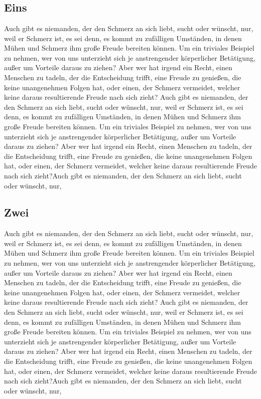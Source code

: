 %
\chapter{\appendixname}

\section{Eins}
Auch gibt es niemanden, der den Schmerz an sich liebt, sucht oder wünscht, nur, weil er Schmerz ist, es sei denn, es kommt zu zufälligen Umständen, in denen Mühen und Schmerz ihm große Freude bereiten können. Um ein triviales Beispiel zu nehmen, wer von uns unterzieht sich je anstrengender körperlicher Betätigung, außer um Vorteile daraus zu ziehen? Aber wer hat irgend ein Recht, einen Menschen zu tadeln, der die Entscheidung trifft, eine Freude zu genießen, die keine unangenehmen Folgen hat, oder einen, der Schmerz vermeidet, welcher keine daraus resultierende Freude nach sich zieht? Auch gibt es niemanden, der den Schmerz an sich liebt, sucht oder wünscht, nur, weil er Schmerz ist, es sei denn, es kommt zu zufälligen Umständen, in denen Mühen und Schmerz ihm große Freude bereiten können. Um ein triviales Beispiel zu nehmen, wer von uns unterzieht sich je anstrengender körperlicher Betätigung, außer um Vorteile daraus zu ziehen? Aber wer hat irgend ein Recht, einen Menschen zu tadeln, der die Entscheidung trifft, eine Freude zu genießen, die keine unangenehmen Folgen hat, oder einen, der Schmerz vermeidet, welcher keine daraus resultierende Freude nach sich zieht?Auch gibt es niemanden, der den Schmerz an sich liebt, sucht oder wünscht, nur,

\section{Zwei}
Auch gibt es niemanden, der den Schmerz an sich liebt, sucht oder wünscht, nur, weil er Schmerz ist, es sei denn, es kommt zu zufälligen Umständen, in denen Mühen und Schmerz ihm große Freude bereiten können. Um ein triviales Beispiel zu nehmen, wer von uns unterzieht sich je anstrengender körperlicher Betätigung, außer um Vorteile daraus zu ziehen? Aber wer hat irgend ein Recht, einen Menschen zu tadeln, der die Entscheidung trifft, eine Freude zu genießen, die keine unangenehmen Folgen hat, oder einen, der Schmerz vermeidet, welcher keine daraus resultierende Freude nach sich zieht? Auch gibt es niemanden, der den Schmerz an sich liebt, sucht oder wünscht, nur, weil er Schmerz ist, es sei denn, es kommt zu zufälligen Umständen, in denen Mühen und Schmerz ihm große Freude bereiten können. Um ein triviales Beispiel zu nehmen, wer von uns unterzieht sich je anstrengender körperlicher Betätigung, außer um Vorteile daraus zu ziehen? Aber wer hat irgend ein Recht, einen Menschen zu tadeln, der die Entscheidung trifft, eine Freude zu genießen, die keine unangenehmen Folgen hat, oder einen, der Schmerz vermeidet, welcher keine daraus resultierende Freude nach sich zieht?Auch gibt es niemanden, der den Schmerz an sich liebt, sucht oder wünscht, nur,


